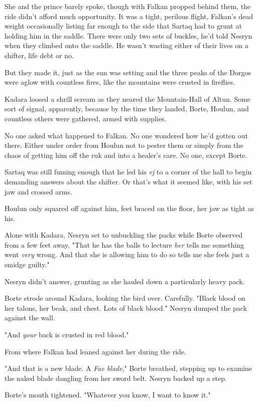 She and the prince barely spoke, though with Falkan propped behind them, the ride didn't afford much opportunity.
It was a tight, perilous flight, Falkan's dead weight occasionally listing far enough to the side that Sartaq had to grunt at holding him in the saddle.
There were only two sets of buckles, he'd told Nesryn when they climbed onto the saddle.
He wasn't wasting either of their lives on a shifter, life debt or no.

But they made it, just as the sun was setting and the three peaks of the Dorgos were aglow with countless fires, like the mountains were crusted in fireflies.

Kadara loosed a shrill scream as they neared the Mountain-Hall of Altun.
Some sort of signal, apparently, because by the time they landed, Borte, Houlun, and countless others were gathered, armed with supplies.

No one asked what happened to Falkan.
No one wondered how he'd gotten out there.
Either under order from Houlun not to pester them or simply from the chaos of getting him off the ruk and into a healer's care.
No one, except Borte.

Sartaq was still fuming enough that he led his \emph{ej} to a corner of the hall to begin demanding answers about the shifter.
Or that's what it seemed like, with his set jaw and crossed arms.

Houlun only squared off against him, feet braced on the floor, her jaw as tight as his.

Alone with Kadara, Nesryn set to unbuckling the packs while Borte observed from a few feet away, "That he has the balls to lecture \emph{her} tells me something went \emph{very} wrong.
And that she is allowing him to do so tells me she feels just a smidge guilty."

Nesryn didn't answer, grunting as she hauled down a particularly heavy pack.

Borte strode around Kadara, looking the bird over.
Carefully.
"Black blood on her talons, her beak, and chest.
Lots of black blood."
Nesryn dumped the pack against the wall.

"And \emph{your} back is crusted in red blood."

From where Falkan had leaned against her during the ride.

"And that is a new blade.
A \emph{Fae blade}," Borte breathed, stepping up to examine the naked blade dangling from her sword belt.
Nesryn backed up a step.

Borte's mouth tightened.
"Whatever you know, I want to know it."

